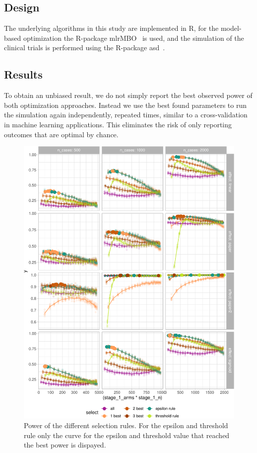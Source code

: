\documentclass[bimj,fleqn]{w-art}
\theoremstyle{plain}
\theoremstyle{definition}
\begin{document}
\subsection{Design}

The underlying algorithms in this study are implemented in R, for the model-based optimization the R-package mlrMBO~\citep{bischl_mlrmbo_2017} is used, and the simulation of the clinical trials is performed using the R-package asd~\citep{parsons_software_2011}.


\subsection{Results}

To obtain an unbiased result, we do not simply report the best observed power of both optimization approaches.
Instead we use the best found parameters to run the simulation again independently, repeated times, similar to a cross-validation in machine learning applications.
This eliminates the risk of only reporting outcomes that are optimal by chance.

\begin{figure}[htb]
\begin{center}
\includegraphics[width=\linewidth]{generated/figures/plot_allbest.pdf}
\caption{Power of the different selection rules. For the epsilon and threshold rule only the curve for the epsilon and threshold value that reached the best power is dispayed.}
\end{center}
\end{figure}
\end{document}
